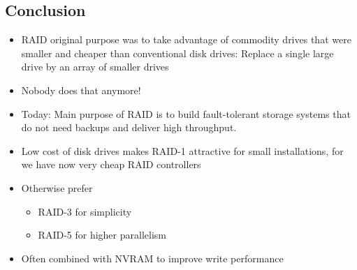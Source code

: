 \documentclass[12pt]{article}
\begin{document}
\subsection{Conclusion}
\begin{itemize}
    \item RAID original purpose was to take advantage of commodity drives that were smaller and cheaper than conventional disk drives: Replace a single large drive by an array of smaller drives 
    \item Nobody does that anymore! 
    \item Today: Main purpose of RAID is to build fault-tolerant storage systems that do not need backups and deliver high throughput. 
    \item Low cost of disk drives makes RAID-1 attractive for small installations, for we have now very cheap RAID controllers
    \item Otherwise prefer \begin{itemize}
        \item RAID-3 for simplicity 
        \item RAID-5 for higher parallelism 
    \end{itemize}
    \item Often combined with NVRAM to improve write performance
\end{itemize}
\end{document}
